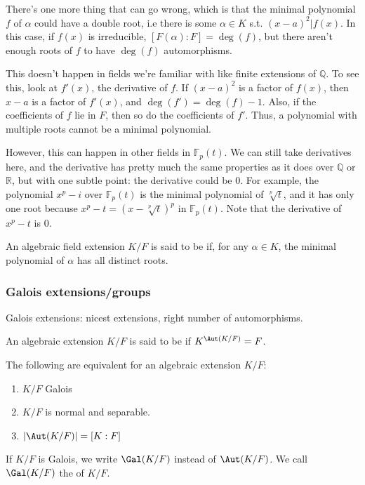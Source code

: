 \documentclass{scrartcl}
\begin{document}
There's one more thing that can go wrong, which is that the minimal polynomial $f$ of $\alpha$ could have a double root, i.e there is some $\alpha \in K$ s.t. $(x-a)^2 | f(x)$. In this case, if $f(x)$ is irreducible, $[F(\alpha) : F] = \deg(f)$, but there aren't enough roots of $f$ to have $\deg(f)$ automorphisms.

This doesn't happen in fields we're familiar with like finite extensions of $\mathbb{Q}$. To see this, look at $f'(x)$, the derivative of $f$. If $(x-a)^2$ is a factor of $f(x)$, then $x-a$ is a factor of $f'(x)$, and $\deg(f') = \deg(f) - 1$. Also, if the coefficients of $f$ lie in $F$, then so do the coefficients of $f'$. Thus, a polynomial with multiple roots cannot be a minimal polynomial.

However, this can happen in other fields in $\mathbb{F}_p(t)$. We can still take derivatives here, and the derivative has pretty much the same properties as it does over $\mathbb{Q}$ or $\mathbb{R}$, but with one subtle point: the derivative could be $0$. For example, the polynomial $x^p-i$ over $\mathbb{F}_p(t)$ is the minimal polynomial of $\sqrt[p]{t}$, and it has only one root because $x^p-t = (x-\sqrt[p]{t})^p$ in $\mathbb{F}_p(t)$. Note that the derivative of $x^p-t$ is $0$.

\begin{definition}
	An algebraic field extension $K/F$ is said to be  if, for any $\alpha \in K$, the minimal polynomial of $\alpha$ has all distinct roots.
\end{definition}

\subsubsection{Galois extensions/groups}
Galois extensions: nicest extensions, right number of automorphisms.
\begin{definition}
	An algebraic extension $K/F$ is said to be  if $K^{\Aut(K/F)} = F$.
\end{definition}

\begin{theorem}
	The following are equivalent for an algebraic extension $K/F$:
	\begin{enumerate}
		\item $K/F$ Galois
		\item $K/F$ is normal and separable.
		\item $|\Aut(K/F)| = [K:F]$
	\end{enumerate}
\end{theorem}

\begin{definition}
	If $K/F$ is Galois, we write $\Gal(K/F)$ instead of $\Aut(K/F)$. We call $\Gal(K/F)$ the  of $K/F$.
\end{definition}
\end{document}

